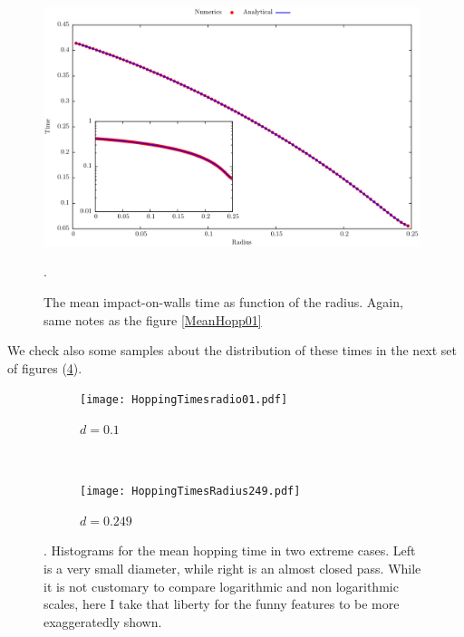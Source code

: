 \documentclass[a4paper,10pt, jcp, aps, preprint]{revtex4-1}
\begin{document}
\begin{figure}[h]
  \centering
  \includegraphics[width=0.98\textwidth]{./FigurasPerfectas/WallImpacts05-ForPaper.pdf}
  \caption{The mean impact-on-walls time as function of the radius. Again, same
    notes as the figure \ref{MeanHopp01}}\label{MeanImp01}.
\end{figure}


We check also some samples about the distribution of these times
in the next set of figures (\ref{histohopps}). 

\begin{figure}[h]
        \centering
        \begin{subfigure}[b]{0.45\textwidth}
                \centering
                \texttt{[image: HoppingTimesradio01.pdf]}
                \caption{$d=0.1$}
                \label{smallradius}
        \end{subfigure}%
        ~ %
        \begin{subfigure}[b]{0.45\textwidth}
                \centering
                \texttt{[image: HoppingTimesRadius249.pdf]}
                \caption{$d=0.249$}
                \label{bigradius}
        \end{subfigure}       
        \caption{.
Histograms for the mean hopping time
in two extreme cases. Left is a very small diameter, while right is an almost
closed pass. While it is not customary to compare logarithmic and non
logarithmic scales, here I take that liberty for the funny features to be
more exaggeratedly shown.}\label{histohopps}
\end{figure}
\end{document}
